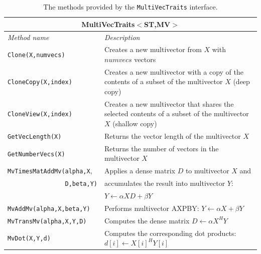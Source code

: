 \documentclass[acmtoms]{acmtrans2m}
\newcommand{\aspace}[1]{\texttt{#1}}
\begin{document}
\begin{table}
\begin{center}
  \caption{The methods provided by the \aspace{MultiVecTraits} interface.}
\label{tab:anasazi:mvt}
\begin{tabular}{| p{4cm} | p{8cm} |}
\hline
\multicolumn{2}{|c|}{\textbf{MultiVecTraits$<$ST,MV$>$}} \\\hline
\emph{Method name} & \emph{Description} \\\hline
{\tt Clone(X,numvecs)}           & Creates a new multivector from $X$ with
$numvecs$ vectors  \\

{\tt CloneCopy(X,index)} & Creates a new multivector with a copy of the contents of
a subset of the multivector $X$ (deep copy) \\

{\tt CloneView(X,index)} & Creates a new multivector that shares the selected
contents of a subset of the multivector $X$ (shallow copy)  \\\hline

{\tt GetVecLength(X)} & Returns the vector length of the multivector $X$
\\

{\tt GetNumberVecs(X)}& Returns the number of vectors in the multivector $X$
\\\hline

{\tt MvTimesMatAddMv(alpha,X}, & Applies a dense matrix $D$ to multivector $X$ and \\ 
{\tt \ \ \ \ \ \ \ \ \ \ \ \ \ \ \ \ D,beta,Y)} & accumulates the result into multivector $Y$:\\ & $Y \leftarrow \alpha X D + \beta Y$  \\

{\tt MvAddMv(alpha,X,beta,Y)}  & Performs multivector AXPBY: $Y \leftarrow \alpha X + \beta Y$
\\

{\tt MvTransMv(alpha,X,Y,D)} & Computes the dense matrix $D \leftarrow \alpha X^H Y$
\\

{\tt MvDot(X,Y,d)} & Computes the corresponding dot products:
$d[i] \leftarrow X[i]^H Y[i]$  \\


\end{tabular}
\end{center}
\end{table}
\end{document}
